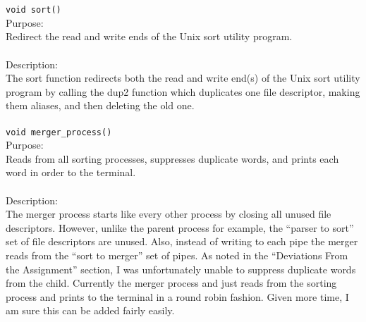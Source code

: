 \documentclass[12pt,letterpaper]{article}
\begin{document}
\\\\
\texttt{void sort()}
\\
Purpose:
\\
Redirect the read and write ends of the Unix sort utility program.
\\\\
Description:
\\
The sort function redirects both the read and write end(s) of the Unix sort utility program by calling the dup2 function which duplicates one file descriptor, making them aliases, and then deleting the old one.
\\\\
\texttt{void merger\_process()}
\\
Purpose:
\\
Reads from all sorting processes, suppresses duplicate words, and prints each word in order to the terminal.
\\\\
Description:
\\
The merger process starts like every other process by closing all unused file descriptors. However, unlike the parent process for example, the ``parser to sort'' set of file descriptors are unused. Also, instead of writing to each pipe the merger reads from the ``sort to merger'' set of pipes. As noted in the ``Deviations From the Assignment'' section, I was unfortunately unable to suppress duplicate words from the child. Currently the merger process and just reads from the sorting process and prints to the terminal in a round robin fashion. Given more time, I am sure this can be added fairly easily.
\\\\
\end{document}
